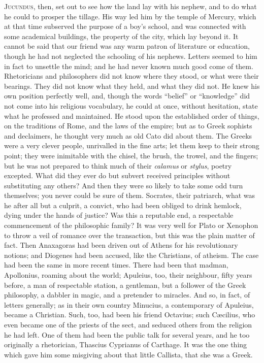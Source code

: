 J\textsc{ucundus}, then, set out to see how the land lay with his
nephew, and to do what he could to prosper the tillage. His way led
him by the temple of Mercury, which at that time subserved the purpose
of a boy's school, and was connected with some academical buildings,
the property of the city, which lay beyond it. It cannot be said that
our friend was any warm patron of literature or education, though he
had not neglected the schooling of his nephews. Letters seemed to him
in fact to unsettle the mind; and he had never known much good come of
them. Rhetoricians and philosophers did not know where they stood, or
what were their bearings. They did not know what they held, and what
they did not. He knew his own position perfectly well, and, though the
words ``belief'' or ``knowledge'' did not come into
his religious vocabulary, he could at once, without hesitation, state
what he professed and maintained. He stood upon the established order
of things, on the traditions of Rome, and the laws of the empire; but
as to Greek sophists and declaimers, he thought very much as old Cato
did about them. The Greeks were a very clever people, unrivalled
in the fine arts; let them keep to their strong point; they were
inimitable with the chisel, the brush, the trowel, and the fingers;
but he was not prepared to think much of their \emph{calamus} or \emph{stylus},
poetry excepted. What did they ever do but subvert received principles
without substituting any others? And then they were so likely to take
some odd turn themselves; you never could be sure of them. Socrates,
their patriarch, what was he after all but a culprit, a convict, who
had been obliged to drink hemlock, dying under the hands of justice?
Was this a reputable end, a respectable commencement of the
philosophic family? It was very well for Plato or Xenophon to throw a
veil of romance over the transaction, but this was the plain matter of
fact. Then Anaxagoras had been driven out of Athens for his
revolutionary notions; and Diogenes had been accused, like the
Christians, of atheism. The case had been the same in more recent
times. There had been that madman, Apollonius, roaming about the
world; Apuleius, too, their neighbour, fifty years before, a man of
respectable station, a gentleman, but a follower of the Greek
philosophy, a dabbler in magic, and a pretender to miracles. And so,
in fact, of letters generally; as in their own country Minucius, a
contemporary of Apuleius, became a Christian. Such, too, had been his
friend Octavius; such Cæcilius, who even became one of the priests of
the sect, and seduced others from the religion he had left. One of
them had been the public talk for several years, and he too
originally a rhetorician, Thascius Cyprianus of Carthage. It was the
one thing which gave him some misgiving about that little Callista,
that she was a Greek.

